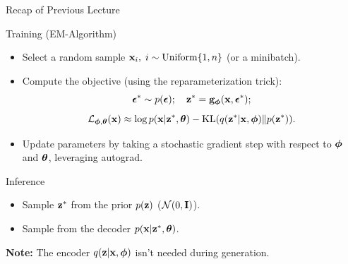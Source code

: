 \documentclass{beamer}
\begin{document}
\begin{frame}{Recap of Previous Lecture}
	\begin{block}{Training (EM-Algorithm)}
		\begin{itemize}
			\item Select a random sample $\mathbf{x}_i, \; i \sim \text{Uniform}\{1, n\}$ (or a minibatch).
			\item Compute the objective (using the reparameterization trick):
			\vspace{-0.3cm}
			\[
				\boldsymbol{\epsilon}^* \sim p(\boldsymbol{\epsilon}); \quad \mathbf{z}^* = \mathbf{g}_{\boldsymbol{\phi}}(\mathbf{x}, \boldsymbol{\epsilon}^*);
			\]
			\[
				\mathcal{L}_{\boldsymbol{\phi}, \boldsymbol{\theta}}(\mathbf{x}) \approx  \log p(\mathbf{x} | \mathbf{z}^*, \boldsymbol{\theta}) - \mathrm{KL}(q(\mathbf{z}^* | \mathbf{x}, \boldsymbol{\phi}) \| p(\mathbf{z}^*)).
			\]
			\item Update parameters by taking a stochastic gradient step with respect to $\boldsymbol{\phi}$ and $\boldsymbol{\theta}$, leveraging autograd.
		\end{itemize}
	\end{block}
	\begin{block}{Inference}
		\begin{itemize}
			\item Sample $\mathbf{z}^*$ from the prior $p(\mathbf{z})$ ($\mathcal{N}(0, \mathbf{I})$).
			\item Sample from the decoder $p(\mathbf{x} | \mathbf{z}^*, \boldsymbol{\theta})$.
		\end{itemize}
	\end{block}
	\textbf{Note:} The encoder $q(\mathbf{z} | \mathbf{x}, \boldsymbol{\phi})$ isn't needed during generation.
\end{frame}
\end{document}
